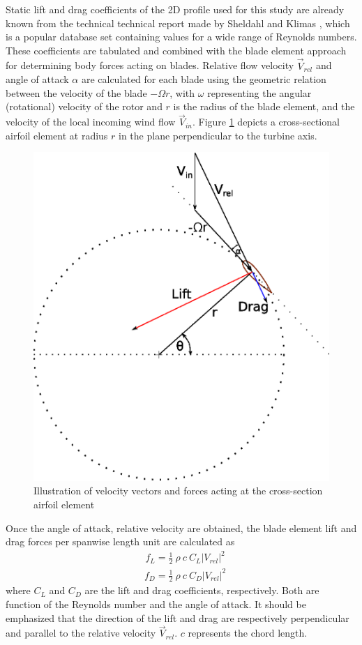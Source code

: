 \documentclass[a4paper]{jpconf}
\begin{document}
Static lift and drag coefficients of the 2D profile used for this study are already known from the technical technical report made by Sheldahl and Klimas \cite{sheldahl1981aerodynamic}, which is a popular database set containing values for a wide range of Reynolds numbers. These coefficients are tabulated and combined with the blade element approach for determining 
body forces acting on blades. Relative flow velocity $\vec{V}_{rel} $ and angle of attack $\alpha$ are calculated for each blade using the geometric relation between the velocity of the blade $- \Omega r$, with $\omega$ representing the angular (rotational) velocity of the rotor and $r$ is the radius of the blade element, and the velocity of the local incoming wind flow $\vec{V}_{in}$. Figure \ref{figvectors} depicts a cross-sectional airfoil element at radius $r$ in the plane perpendicular to the turbine axis.   

\begin{figure}[h]
\begin{center}
\includegraphics[width=0.35\columnwidth]{vector.eps}
\end{center}
\caption{\label{figvectors} Illustration of velocity vectors and forces acting at the cross-section airfoil element}
\end{figure}

Once the angle of attack, relative velocity are obtained, the blade element lift and drag forces per spanwise length unit are calculated as
\begin{align}
& f_L = \frac{1}{2} \ \rho \ c \ C_L \left| V_{rel} \right|^2  \label{lift}  
\end{align} %
\begin{align}
& f_D = \frac{1}{2} \ \rho \ c \ C_D \left| V_{rel} \right|^2  \label{drag}  
\end{align} %
where $C_L$ and $C_D$ are the lift and drag coefficients, respectively. Both are function of the Reynolds number and the angle of attack. It should be emphasized that the direction of the lift and drag are respectively perpendicular and parallel to the relative velocity $\vec{V}_{rel}$. $c$ represents the chord length.
\end{document}
